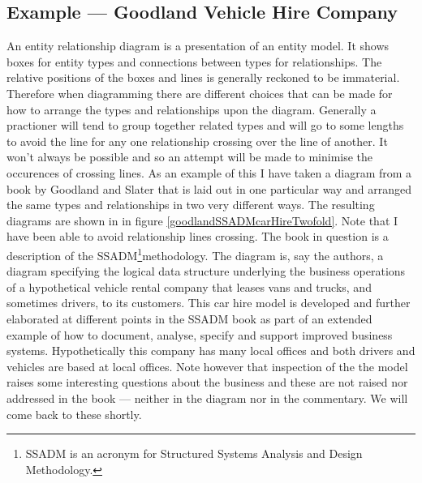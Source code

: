 \subsection{Example --- Goodland Vehicle Hire Company}
\label{GoodlandVehicleHireCompany}
\mynote
An entity relationship diagram is a presentation of an entity model.
It shows boxes for entity types and connections between types for relationships.
\mynote
The relative positions of the boxes and lines is generally reckoned to be immaterial. 
Therefore when diagramming there
are  different choices that can be made for how to arrange the types and relationships
 upon the diagram. Generally a practioner will tend to group together related types and will 
 go to some lengths to avoid the line for any one relationship crossing over the line of another.
It won't always be possible and so an attempt will be made to minimise the occurences of crossing lines.    
As an example of this I have taken a diagram from a book by Goodland and Slater that is laid out in one particular way and arranged the same types and relationships in two very different ways. The resulting diagrams are shown in  in figure \ref{goodlandSSADMcarHireTwofold}.  Note that I have been able to avoid relationship lines crossing.
The book in question is a description of the SSADM\footnote{SSADM is an acronym for Structured Systems Analysis and Design Methodology.}methodology. 
The diagram is, say the authors, a diagram specifying the logical data structure underlying the business operations of a hypothetical vehicle rental company that leases vans and trucks, and sometimes drivers, to its customers. 
\mynote
This car hire model is developed and further elaborated at different points in the SSADM book as part of an extended example of how to document, analyse, specify and support improved business systems. 
\mynote 
Hypothetically this company has many local offices and both drivers and vehicles are based at local offices. 
Note however that inspection of the the model raises some interesting questions about the business 
and these are not raised nor addressed in the book ---
neither in the diagram nor in the commentary. 
We will come back to these shortly.

